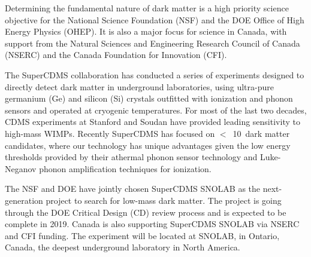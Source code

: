 Determining the fundamental nature of dark matter is a high priority science objective for the National Science Foundation (NSF) and the DOE Office of High Energy Physics (OHEP). It is also a major focus for science in Canada, with support from the Natural Sciences and Engineering Research Council of Canada (NSERC) and the Canada Foundation for Innovation (CFI). 

The SuperCDMS collaboration has conducted a series of experiments designed to directly detect dark matter in underground laboratories, using ultra-pure germanium (Ge) and silicon (Si) crystals outfitted with ionization and phonon sensors and operated at cryogenic temperatures. For most of the last two decades, CDMS experiments at Stanford and Soudan have provided leading sensitivity to high-mass WIMPs. Recently SuperCDMS has focused on $<$~10~\gev dark matter candidates, where our technology has unique advantages given the low energy thresholds provided by their athermal phonon sensor technology and Luke-Neganov phonon amplification techniques for ionization.

The NSF and DOE have jointly chosen SuperCDMS SNOLAB as the next-generation project to search for low-mass dark matter. The project is going through the DOE Critical Design (CD) review process and is expected to be complete in 2019. Canada is also supporting SuperCDMS SNOLAB via NSERC and CFI funding. The experiment will be located at SNOLAB, in Ontario, Canada, the deepest underground laboratory in North America.
